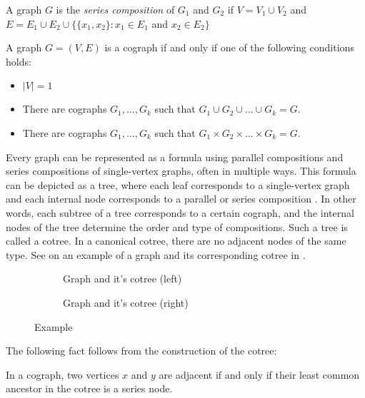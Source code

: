 \begin{definition}
A graph $G$ is the \emph{series composition} of $G_1$ and $G_2$ if $V=  V_1 \cup V_2$ and $E=E_1\cup E_2 \cup \{ \{x_1,x_2\}  \colon x_1 \in E_1$ and $x_2 \in E_2  \}$
\end{definition}
\begin{theorem} 
     A graph $G=(V,E)$ is a cograph if and only if one of the following
conditions holds:
\begin{itemize}
    \item $ |V| = 1$
    \item  There are cographs $G_1, \dots, G_k$ such that $G_1 \cup G_2 \cup \dots \cup G_k=G$.
    \item There are cographs $G_1, \dots, G_k$ such that $G_1 \times G_2 \times \dots \times G_k=G$.
\end{itemize}
\end{theorem}

Every graph can be represented as a formula using parallel compositions and series compositions of single-vertex graphs, often in multiple ways. This formula can be depicted as a tree, where each leaf corresponds to a single-vertex graph and each internal node corresponds to a parallel or series composition . In other words, each subtree of a tree corresponds to a certain cograph, and the internal nodes of the tree determine the order and type of compositions. Such a tree is called a cotree. In a canonical cotree, there are no adjacent nodes of the same type. See on an example of a graph and its corresponding cotree in .

\begin{figure}
\centering
    \begin{subfigure}[b]{0.35\textwidth}
    \centering
    
    \caption{Graph and it's cotree (left)}
    \label{fig:An example cograph}
    \end{subfigure}
    \qquad
    \begin{subfigure}[b]{0.55\textwidth}
    \centering
    
    \caption{Graph and it's cotree (right)}
    \label{fig:An example cotree}
    \end{subfigure}
    \label{fig:Example}
    \caption{Example}
\end{figure}

The following fact follows from the construction of the cotree:

\begin{remark}
In a cograph, two vertices $x$ and $y$ are adjacent if and only if their least common ancestor in the cotree is a series node.
\label{Ancestors remark}
\end{remark}

